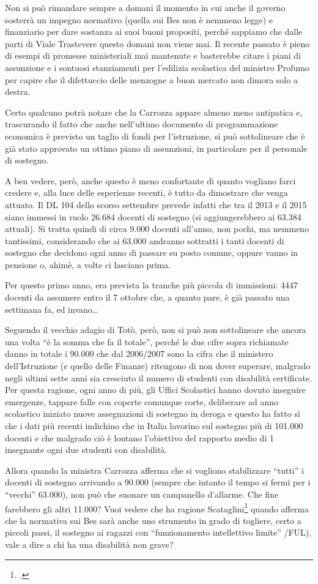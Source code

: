 \begin{description}
	  Non si può rimandare sempre a domani il momento in cui anche il governo sosterrà un impegno normativo (quella sui Bes non è nemmeno legge) e finanziario per dare sostanza ai suoi buoni propositi, perché sappiamo che dalle parti di Viale Trastevere questo domani non viene mai. Il recente passato è pieno di esempi di promesse ministeriali mai mantenute e basterebbe citare i piani di assunzione e i sontuosi stanziamenti per l'edilizia scolastica del ministro Profumo per capire che il difettuccio delle menzogne a buon mercato non dimora solo a destra.
	  
	  Certo qualcuno potrà notare che la Carrozza appare almeno meno antipatica e, trascurando il fatto che anche nell'ultimo documento di programmazione economica è previsto un taglio di fondi per l'istruzione, si può sottolineare che è già stato approvato un ottimo piano di assunzioni, in particolare per il personale di sostegno.
	  
	  A ben vedere, però, anche questo è meno confortante di quanto vogliano farci credere e, alla luce delle esperienze recenti, è tutto da dimostrare che venga attuato. Il DL 104 dello scorso settembre prevede infatti che tra il 2013 e il 2015 siano immessi in ruolo 26.684 docenti di sostegno (si aggiungerebbero ai 63.384 attuali). Si tratta quindi di circa 9.000 docenti all'anno, non pochi, ma nemmeno tantissimi, considerando che ai 63.000 andranno sottratti i tanti docenti di sostegno che decidono ogni anno di passare su posto comune, oppure vanno in pensione o, ahimè, a volte ci lasciano prima.
	  
	  Per questo primo anno, era prevista la tranche più piccola di immissioni: 4447 docenti da assumere entro il 7 ottobre che, a quanto pare, è già passato una settimana fa, ed invano…
	  
	  Seguendo il vecchio adagio di Totò, però, non si può non sottolineare che ancora una volta “è la somma che fa il totale”, perché le due cifre sopra richiamate danno in totale i 90.000 che dal 2006/2007 sono la cifra che il ministero dell'Istruzione (e quello delle Finanze) ritengono di non dover superare, malgrado negli ultimi sette anni sia cresciuto il numero di studenti con disabilità certificate. Per questa ragione, ogni anno di più, gli Uffici Scolastici hanno dovuto inseguire emergenze, tappare falle con coperte comunque corte, deliberare ad anno scolastico iniziato nuove assegnazioni di sostegno in deroga e questo ha fatto sì che i dati più recenti indichino che in Italia lavorino sul sostegno più di 101.000 docenti e che malgrado ciò è lontano l'obiettivo del rapporto medio di 1 insegnante ogni due studenti con disabilità.
	  
	  Allora quando la ministra Carrozza afferma che si vogliono stabilizzare “tutti” i docenti di sostegno arrivando a 90.000 (sempre che intanto il tempo si fermi per i “vecchi” 63.000), non può che suonare un campanello d'allarme. Che fine farebbero gli altri 11.000? Vuoi vedere che ha ragione Scataglini\footcite{Scataglini2013} quando afferma che la normativa sui Bes sarà anche uno strumento in grado di togliere, certo a piccoli passi, il sostegno ai ragazzi con “funzionamento intellettivo limite” /FUL), vale a dire a chi ha una disabilità non grave?
\end{description}
